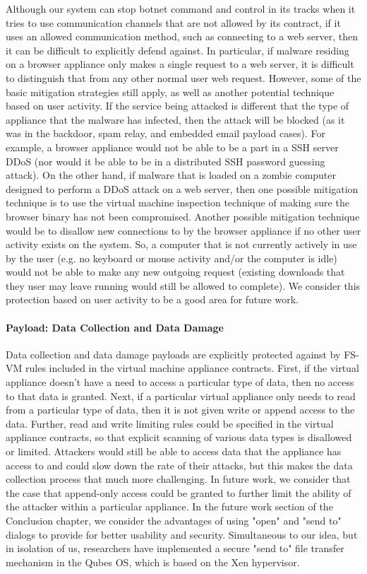Although our system can stop botnet command and control in its tracks when it tries to use communication channels that are not allowed by its contract, if it uses an allowed communication method, such as connecting to a web server, then it can be difficult to explicitly defend against. In particular, if malware residing on a browser appliance only makes a single request to a web server, it is difficult to distinguish that from any other normal user web request. However, some of the basic mitigation strategies still apply, as well as another potential technique based on user activity. If the service being attacked is different that the type of appliance that the malware has infected, then the attack will be blocked (as it was in the backdoor, spam relay, and embedded email payload cases). For example, a browser appliance would not be able to be a part in a SSH server DDoS (nor would it be able to be in a distributed SSH password guessing attack). On the other hand, if malware that is loaded on a zombie computer designed to perform a DDoS attack on a web server, then one possible mitigation technique is to use the virtual machine inspection technique of making sure the browser binary has not been compromised. Another possible mitigation technique would be to disallow new connections to by the browser appliance if no other user activity exists on the system. So, a computer that is not currently actively in use by the user (e.g. no keyboard or mouse activity and/or the computer is idle) would not be able to make any new outgoing request (existing downloads that they user may leave running would still be allowed to complete). We consider this protection based on user activity to be a good area for future work.

\paragraph{Payload: Data Collection and Data Damage}
Data collection and data damage payloads are explicitly protected against by FS-VM rules included in the virtual machine appliance contracts. First, if the virtual appliance doesn't have a need to access a particular type of data, then no access to that data is granted. Next, if a particular virtual appliance only needs to read from a particular type of data, then it is not given write or append access to the data. Further, read and write limiting rules could be specified in the virtual appliance contracts, so that explicit scanning of various data types is disallowed or limited. Attackers would still be able to access data that the appliance has access to and could slow down the rate of their attacks, but this makes the data collection process that much more challenging. In future work, we consider that the case that append-only access could be granted to further limit the ability of the attacker within a particular appliance. In the future work section of the Conclusion chapter, we consider the advantages of using "open" and "send to" dialogs to provide for better usability and security. Simultaneous to our idea, but in isolation of us, researchers have implemented a secure "send to" file transfer mechanism in the Qubes OS\cite{qubes-os_2010}, which is based on the Xen hypervisor.

